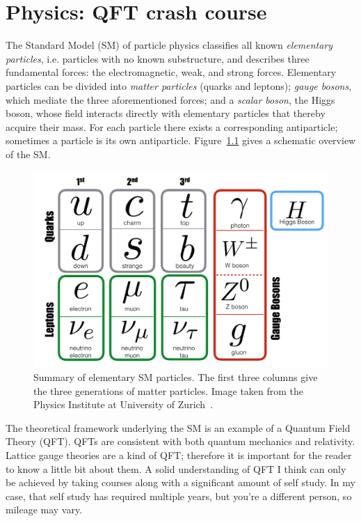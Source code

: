 \chapter{Physics: QFT crash course} 

The Standard Model (SM) of particle physics classifies all known
{\it elementary particles}, i.e. particles with no known substructure,
and describes three fundamental forces: the electromagnetic,
weak, and strong forces. Elementary particles can be divided into
{\it matter particles} (quarks and leptons); {\it gauge bosons}, which mediate
the three aforementioned forces; and a {\it scalar boson}, the Higgs boson,
whose field interacts directly with elementary particles that thereby
acquire their mass. For each particle there exists a corresponding
antiparticle; sometimes a particle is its own antiparticle.
Figure~\ref{fig:SM} gives a schematic overview of the SM.

\begin{figure}
  \centering
  \includegraphics[width=0.80\linewidth]{figs/SM.png}
  \caption{Summary of elementary SM particles. The first three columns give
           the three generations of matter particles. Image taken
           from the Physics Institute at University of 
           Zurich~\cite{zurich_SM}.}
  \label{fig:SM}
\end{figure}

The theoretical framework underlying the SM is an example of a Quantum 
Field Theory (QFT). QFTs are consistent with both quantum mechanics and
relativity. Lattice gauge theories are a kind of QFT; therefore it is
important for the reader to know a little bit about them. A solid understanding
of QFT I think can only be achieved by taking courses along with a significant
amount of self study. In my case, that self study has required multiple years,
but you're a different person, so mileage may vary.

